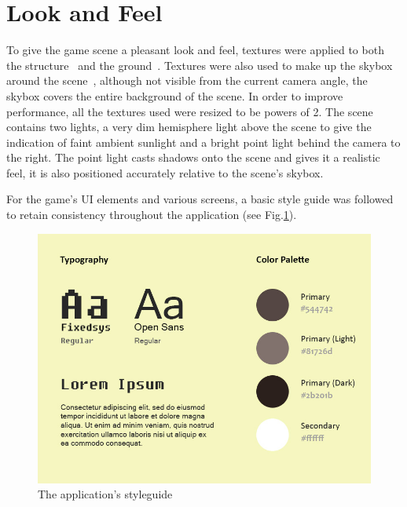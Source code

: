 \documentclass[runningheads]{llncs}
\begin{document}
	\section{Look and Feel}
	To give the game scene a pleasant look and feel, textures were applied to both the structure~\cite{ref_wood} and the ground~\cite{ref_marble}. Textures were also used to make up the skybox around the scene~\cite{ref_skybox}, although not visible from the current camera angle, the skybox covers the entire background of the scene. In order to improve performance, all the textures used were resized to be powers of 2. The scene contains two lights, a very dim hemisphere light above the scene to give the indication of faint ambient sunlight and a bright point light behind the camera to the right. The point light casts shadows onto the scene and gives it a realistic feel, it is also positioned accurately relative to the scene's skybox.
	
	For the game's UI elements and various screens, a basic style guide was followed to retain consistency throughout the application (see Fig.\ref{styleguide}).
	
	\newpage
	\begin{figure}
		\centering
		\includegraphics[width=\textwidth]{./img/styleguide.jpg}
		\caption{The application's styleguide}
		\label{styleguide}
	\end{figure}
	
\end{document}
